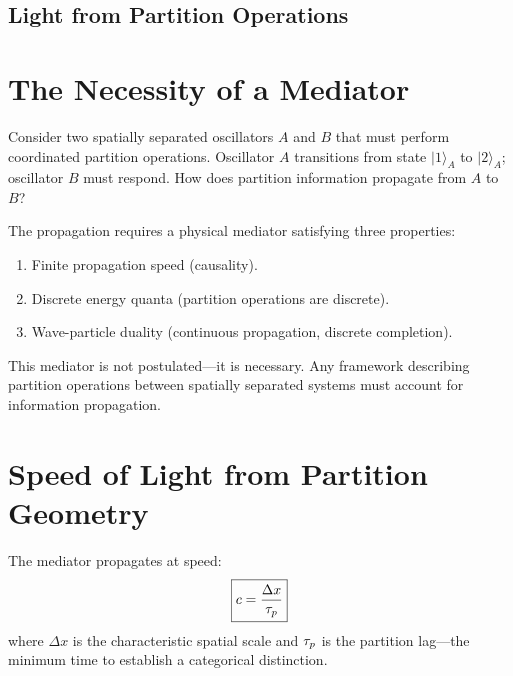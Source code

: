 
\subsection{Light from Partition Operations}
\label{part:light}

\section{The Necessity of a Mediator}
\label{sec:mediator}

Consider two spatially separated oscillators $A$ and $B$ that must perform coordinated partition operations. Oscillator $A$ transitions from state $|1\rangle_A$ to $|2\rangle_A$; oscillator $B$ must respond. How does partition information propagate from $A$ to $B$?

The propagation requires a physical mediator satisfying three properties:
\begin{enumerate}
    \item Finite propagation speed (causality).
    \item Discrete energy quanta (partition operations are discrete).
    \item Wave-particle duality (continuous propagation, discrete completion).
\end{enumerate}

This mediator is not postulated---it is necessary. Any framework describing partition operations between spatially separated systems must account for information propagation.

\section{Speed of Light from Partition Geometry}
\label{sec:speed_of_light}

\begin{theorem}
\label{thm:speed_of_light}
The mediator propagates at speed:
\begin{equation}
\boxed{c = \frac{\Delta x}{\tau_p}}
\end{equation}
where $\Delta x$ is the characteristic spatial scale and $\tau_p$ is the partition lag---the minimum time to establish a categorical distinction.
\end{theorem}

